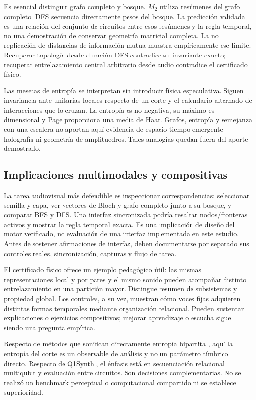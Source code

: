 \documentclass[pdflatex,iicol,sn-basic,Numbered]{sn-jnl}
\begin{document}
Es esencial distinguir grafo completo y bosque. $M_2$ utiliza resúmenes del grafo completo; DFS secuencia directamente pesos del bosque. La predicción validada es una relación del conjunto de circuitos entre esos resúmenes y la regla temporal, no una demostración de conservar geometría matricial completa. La no replicación de distancias de información mutua muestra empíricamente ese límite. Recuperar topología desde duración DFS contradice su invariante exacto; recuperar entrelazamiento central arbitrario desde audio contradice el certificado físico.

Las mesetas de entropía se interpretan sin introducir física especulativa. Siguen invariancia ante unitarias locales respecto de un corte y el calendario alternado de interacciones que lo cruzan. La entropía es no negativa, su máximo es dimensional y Page proporciona una media de Haar. Grafos, entropía y semejanza con una escalera no aportan aquí evidencia de espacio-tiempo emergente, holografía ni geometría de amplituedros. Tales analogías quedan fuera del aporte demostrado.

\subsection{Implicaciones multimodales y compositivas}
La tarea audiovisual más defendible es inspeccionar correspondencias: seleccionar semilla y capa, ver vectores de Bloch y grafo completo junto a su bosque, y comparar BFS y DFS. Una interfaz sincronizada podría resaltar nodos/fronteras activos y mostrar la regla temporal exacta. Es una implicación de diseño del motor verificado, no evaluación de una interfaz implementada en este estudio. Antes de sostener afirmaciones de interfaz, deben documentarse por separado sus controles reales, sincronización, capturas y flujo de tarea.

El certificado físico ofrece un ejemplo pedagógico útil: las mismas representaciones local y por pares y el mismo sonido pueden acompañar distinto entrelazamiento en una partición mayor. Distingue resumen de subsistemas y propiedad global. Los controles, a su vez, muestran cómo voces fijas adquieren distintas formas temporales mediante organización relacional. Pueden sustentar explicaciones o ejercicios compositivos; mejorar aprendizaje o escucha sigue siendo una pregunta empírica.

Respecto de métodos que sonifican directamente entropía bipartita \citep{Tudoce2026}, aquí la entropía del corte es un observable de análisis y no un parámetro tímbrico directo. Respecto de Q1Synth \citep{Miranda2023}, el énfasis está en secuenciación relacional multiqubit y evaluación entre circuitos. Son decisiones complementarias. No se realizó un benchmark perceptual o computacional compartido ni se establece superioridad.
\end{document}
